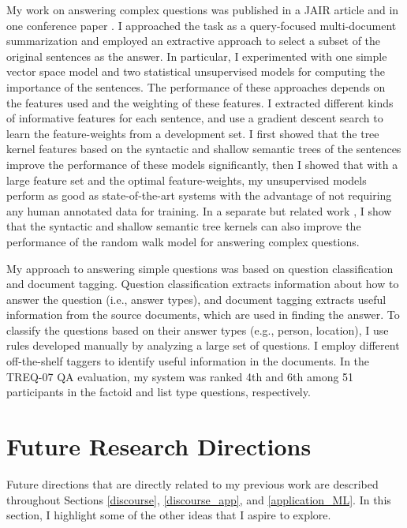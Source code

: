 \documentclass{article} %
\begin{document}
My work on answering complex questions was published in a JAIR article \cite{Chali:2009:CQA} and in one conference paper \cite{Chali:2008}. I approached the task as a query-focused multi-document summarization and employed an extractive approach to select a subset of the original sentences as the answer. In particular, I experimented with one simple vector space model and two statistical unsupervised models for computing the importance of the sentences. The performance of these approaches depends on the features used and the weighting of these features. I extracted different kinds of informative features for each sentence, and use a gradient descent search to learn the feature-weights from a development set. I first showed that the tree kernel features based on the syntactic and shallow semantic trees of the sentences improve the performance of these models significantly, then I showed that with a large feature set and the optimal feature-weights, my unsupervised models perform as good as state-of-the-art systems with the advantage of not requiring any human annotated data for training. In a separate but related work \cite{Chali:acl:2008}, I show that the syntactic and shallow semantic tree kernels can also improve the performance of the random walk model for answering complex questions. 


My approach to answering simple questions was based on question classification and document tagging. Question classification extracts information about how to answer the question (i.e., answer types), and document tagging extracts useful information from the source documents, which are used in finding the answer. To classify the questions based on their answer types (e.g., person, location), I use rules developed manually by analyzing a large set of questions. I employ different off-the-shelf
taggers to identify useful information in the documents. In the TREQ-07 QA evaluation, my system
was ranked 4th and 6th among 51 participants in the factoid and list type questions, respectively.


\section{Future Research Directions} \label{future}

Future directions that are directly related to my previous work are described throughout Sections \ref{discourse}, \ref{discourse_app}, and \ref{application_ML}. In this section, I highlight some of the other ideas that I aspire to explore.
\end{document}
